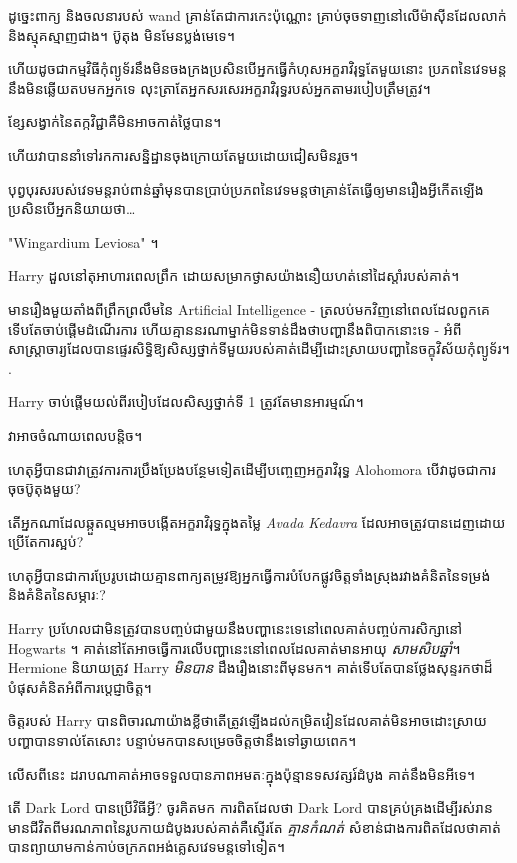 ដូច្នេះពាក្យ និងចលនារបស់ wand គ្រាន់តែជាការកេះប៉ុណ្ណោះ គ្រាប់ចុចទាញនៅលើម៉ាស៊ីនដែលលាក់ និងស្មុគស្មាញជាង។ ប៊ូតុង មិនមែនប្លង់មេទេ។

ហើយដូចជាកម្មវិធីកុំព្យូទ័រនឹងមិនចងក្រងប្រសិនបើអ្នកធ្វើកំហុសអក្ខរាវិរុទ្ធតែមួយនោះ ប្រភពនៃវេទមន្តនឹងមិនឆ្លើយតបមកអ្នកទេ លុះត្រាតែអ្នកសរសេរអក្ខរាវិរុទ្ធរបស់អ្នកតាមរបៀបត្រឹមត្រូវ។

ខ្សែសង្វាក់នៃតក្កវិជ្ជាគឺមិនអាចកាត់ថ្លៃបាន។

ហើយវាបាននាំទៅរកការសន្និដ្ឋានចុងក្រោយតែមួយដោយជៀសមិនរួច។

បុព្វបុរស​របស់​វេទមន្ត​រាប់ពាន់​ឆ្នាំមុន​បាន​ប្រាប់​ប្រភព​នៃ​វេទមន្ត​ថា​គ្រាន់តែ​ធ្វើ​ឲ្យ​មាន​រឿង​អ្វី​កើតឡើង​ប្រសិនបើ​អ្នក​និយាយថា…

"Wingardium Leviosa" ។

Harry ដួល​នៅ​តុ​អាហារ​ពេល​ព្រឹក ដោយ​សម្រាក​ថ្ងាស​យ៉ាង​នឿយ​ហត់​នៅ​ដៃ​ស្តាំ​របស់​គាត់។

មានរឿងមួយតាំងពីព្រឹកព្រលឹមនៃ Artificial Intelligence - ត្រលប់មកវិញនៅពេលដែលពួកគេទើបតែចាប់ផ្តើមដំណើរការ ហើយគ្មាននរណាម្នាក់មិនទាន់ដឹងថាបញ្ហានឹងពិបាកនោះទេ - អំពីសាស្រ្តាចារ្យដែលបានផ្ទេរសិទ្ធិឱ្យសិស្សថ្នាក់ទីមួយរបស់គាត់ដើម្បីដោះស្រាយបញ្ហានៃចក្ខុវិស័យកុំព្យូទ័រ។ .

Harry ចាប់ផ្តើមយល់ពីរបៀបដែលសិស្សថ្នាក់ទី 1 ត្រូវតែមានអារម្មណ៍។

វាអាចចំណាយពេលបន្តិច។

ហេតុអ្វី​បាន​ជា​វា​ត្រូវ​ការ​ការ​ប្រឹងប្រែង​បន្ថែម​ទៀត​ដើម្បី​បញ្ចេញ​អក្ខរាវិរុទ្ធ Alohomora បើ​វា​ដូច​ជា​ការ​ចុច​ប៊ូតុង​មួយ?

តើអ្នកណាដែលឆ្កួតល្មមអាចបង្កើតអក្ខរាវិរុទ្ធក្នុងតម្លៃ \emph{Avada Kedavra} ដែលអាចត្រូវបានដេញដោយប្រើតែការស្អប់?

ហេតុអ្វីបានជាការប្រែរូបដោយគ្មានពាក្យតម្រូវឱ្យអ្នកធ្វើការបំបែកផ្លូវចិត្តទាំងស្រុងរវាងគំនិតនៃទម្រង់ និងគំនិតនៃសម្ភារៈ?

Harry ប្រហែលជាមិនត្រូវបានបញ្ចប់ជាមួយនឹងបញ្ហានេះទេនៅពេលគាត់បញ្ចប់ការសិក្សានៅ Hogwarts ។ គាត់នៅតែអាចធ្វើការលើបញ្ហានេះនៅពេលដែលគាត់មានអាយុ \emph{សាមសិបឆ្នាំ}។ Hermione និយាយត្រូវ Harry \emph{មិនបាន} ដឹងរឿងនោះពីមុនមក។ គាត់ទើបតែបានថ្លែងសុន្ទរកថាដ៏បំផុសគំនិតអំពីការប្តេជ្ញាចិត្ត។

ចិត្តរបស់ Harry បានពិចារណាយ៉ាងខ្លីថាតើត្រូវឡើងដល់កម្រិតវៀនដែលគាត់មិនអាចដោះស្រាយបញ្ហាបានទាល់តែសោះ បន្ទាប់មកបានសម្រេចចិត្តថានឹងទៅឆ្ងាយពេក។

លើសពីនេះ ដរាបណាគាត់អាចទទួលបានភាពអមតៈក្នុងប៉ុន្មានទសវត្សរ៍ដំបូង គាត់នឹងមិនអីទេ។

តើ Dark Lord បានប្រើវិធីអ្វី? ចូរគិតមក ការពិតដែលថា Dark Lord បានគ្រប់គ្រងដើម្បីរស់រានមានជីវិតពីមរណភាពនៃរូបកាយដំបូងរបស់គាត់គឺស្ទើរតែ \emph{គ្មានកំណត់} សំខាន់ជាងការពិតដែលថាគាត់បានព្យាយាមកាន់កាប់ចក្រភពអង់គ្លេសវេទមន្តទៅទៀត។

